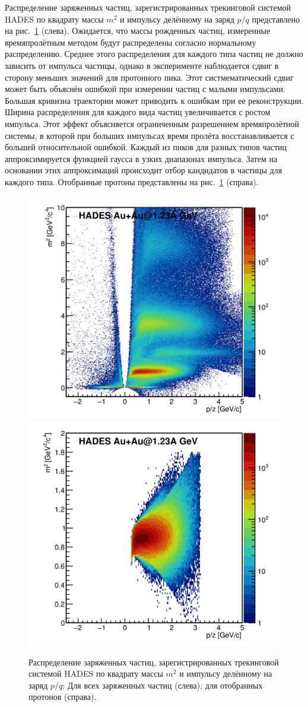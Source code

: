 Распределение заряженных частиц, зарегистрированных трекинговой системой HADES по квадрату массы $m^2$ и импульсу делённому на заряд $p/q$ представлено на рис.~\ref{fig:hades_m2_pq} (слева).
Ожидается, что массы рожденных частиц, измеренные времяпролётным методом будут распределены согласно нормальному распределению.
Среднее этого распределения для каждого типа частиц не должно зависить от импульса частицы, однако в эксперименте наблюдается сдвиг в сторону меньших значений для протонного пика.
Этот систмематический сдвиг может быть объяснён ошибкой при измерении частиц с малыми импульсами.
Большая кривизна траектории может приводить к ошибкам при ее реконструкции.
Ширина распределения для каждого вида частиц увеличивается с ростом импульса.
Этот эффект объясняется ограниченным разрешением времяпролётной системы, в которой при больших импульсах время пролёта восстанавливается с большей относительной ошибкой.
Каждый из пиков для разных типов частиц аппроксимируется функцией гаусса в узких диапазонах импульса.
Затем на основании этих аппроксимаций происходит отбор кандидатов в частицы для каждого типа.
Отобранные протоны представлены на рис.~\ref{fig:hades_m2_pq} (справа).
%
\begin{figure}[ht]
\begin{center}
\includegraphics[width=0.45\linewidth]{images/au123_m2_vs_pq_all.png}
\includegraphics[width=0.45\linewidth]{images/au123_m2_vs_pq_protons.png}
\caption{Распределение заряженных частиц, зарегистрированных трекинговой системой HADES по квадрату массы $m^2$ и импульсу делённому на заряд $p/q$: Для всех заряженных частиц (слева), для отобранных протонов (справа).}
\label{fig:hades_m2_pq}
\end{center}
\end{figure}

